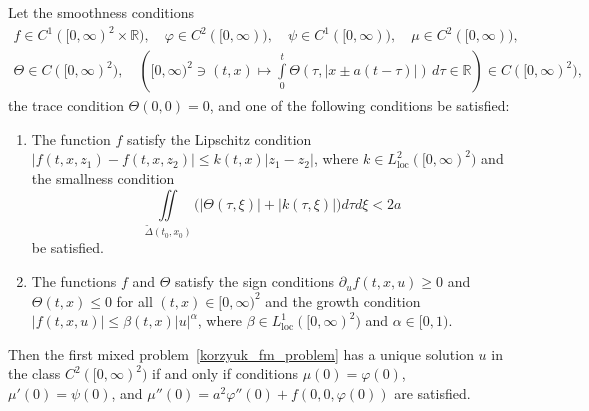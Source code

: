 \documentclass[12pt]{llncs}
\begin{document}
\begin{theorem}\label{korzyuk_fmp_cau_solve_cl} Let the smoothness conditions
\begin{equation*}
    \begin{gathered}
      f\in C^1([0, \infty)^2 \times \mathbb{R}), \quad \varphi \in C^2([0,\infty)), \quad \psi \in C^1([0,\infty)), \quad \mu \in  C^2([0,\infty)), \\
      \Theta \in C([0, \infty)^2),\quad \left( [0, \infty)^2\ni (t,x)\mapsto \int\limits_{0}^{t}{\Theta ( \tau ,|x\pm a( t-\tau  )|)\, d\tau }\in \mathbb{R} \right)\in C([0, \infty)^2),
    \end{gathered}
\end{equation*}  
the trace condition $\Theta(0, 0) = 0$, and one of the following conditions be satisfied:
	\begin{enumerate}
		\item The function $f$ satisfy the Lipschitz condition $|f(t, x, z_1) - f(t, x, z_2)| \leq k(t, x)|z_1 - z_2|$, where $k \in L^2_\mathrm{loc}([0, \infty)^2)$ and the smallness condition
    $$
    \iint\limits_{\widetilde{\Delta} ( {{t}_{0}},{{x}_{0}} )} \big(|\Theta(\tau, \xi)| + |k(\tau, \xi)|\big) d\tau d\xi < 2 a
    $$ 
    be satisfied.
		\item The functions $f$ and $\Theta$ satisfy the sign conditions $\partial_u f(t, x, u) \geq 0$ and $\Theta(t,x) \leq 0$ for all $(t,x) \in [0, \infty)^2$ and the growth condition $|f(t,x,u)| \leq \beta(t,x) |u|^\alpha$, where $\beta \in L^1_\mathrm{loc}([0, \infty)^2)$ and $\alpha \in [0, 1)$.
	\end{enumerate}
\noindent Then the first mixed problem~\eqref{korzyuk_fm_problem} has a unique solution $u$ in the class $C^2([0, \infty)^2)$ if and only if conditions $\mu(0) = \varphi(0)$, $\mu'(0) = \psi(0)$, and $\mu''(0) = a^2 \varphi''(0) + f(0, 0, \varphi(0))$ are satisfied.
\end{theorem}

\end{document}

